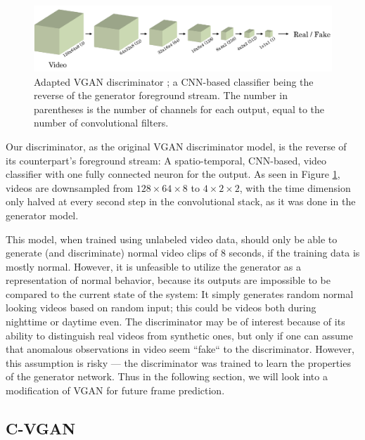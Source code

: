 \begin{figure}
	\centering
	\includegraphics[width=1\textwidth]{graphics/gan/vgan/vgan/vgan_d.pdf}
  \caption[Adapted video discriminator network.]{Adapted VGAN discriminator \cite{vondrick2016generating}; a CNN-based classifier being the reverse of the generator foreground stream. The number in parentheses is the number of channels for each output, equal to the number of convolutional filters.}
  \label{fig:vgan_d}
\end{figure}

Our discriminator, as the original VGAN discriminator model, is the reverse of its counterpart's foreground stream: A spatio-temporal, CNN-based, video classifier with one fully connected neuron for the output. As seen in Figure \ref{fig:vgan_d}, videos are downsampled from $128 \times 64 \times 8$ to $4 \times 2 \times 2$, with the time dimension only halved at every second step in the convolutional stack, as it was done in the generator model.

This model, when trained using unlabeled video data, should only be able to generate (and discriminate) normal video clips of 8 seconds, if the training data is mostly normal. However, it is unfeasible to utilize the generator as a representation of normal behavior, because its outputs are impossible to be compared to the current state of the system: It simply generates random normal looking videos based on random input; this could be videos both during nighttime or daytime even. The discriminator may be of interest because of its ability to distinguish real videos from synthetic ones, but only if one can assume that anomalous observations in video seem ``fake`` to the discriminator. However, this assumption is risky --- the discriminator was trained to learn the properties of the generator network. Thus in the following section, we will look into a modification of VGAN for future frame prediction.


\subsection{C-VGAN} \label{subsec:cvgan_mod}

